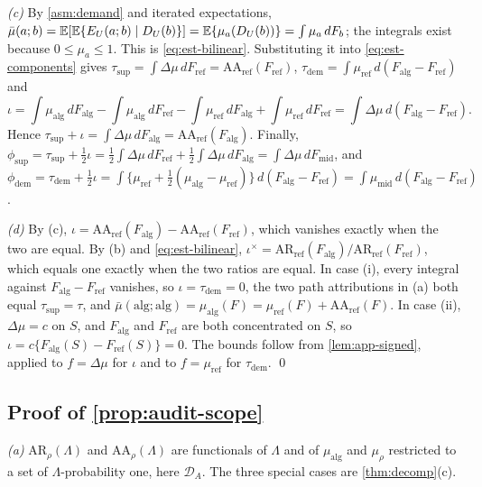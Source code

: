 \emph{(c)} By \cref{asm:demand} and iterated expectations, $\bar\mu(a;b)=\mathbb{E}[\mathbb{E}\{E_U(a;b)\mid D_U(b)\}]=\mathbb{E}\{\mu_a(D_U(b))\}=\int\mu_a\,dF_b$; the integrals exist because $0\le\mu_a\le1$. This is \eqref{eq:est-bilinear}. Substituting it into \eqref{eq:est-components} gives $\tau_{\mathrm{sup}}=\int\Delta\mu\,dF_{\mathrm{ref}}=\mathrm{AA}_{\mathrm{ref}}(F_{\mathrm{ref}})$, $\tau_{\mathrm{dem}}=\int\mu_{\mathrm{ref}}\,d(F_{\mathrm{alg}}-F_{\mathrm{ref}})$ and
\[
  \iota=\int\mu_{\mathrm{alg}}\,dF_{\mathrm{alg}}-\int\mu_{\mathrm{alg}}\,dF_{\mathrm{ref}}-\int\mu_{\mathrm{ref}}\,dF_{\mathrm{alg}}+\int\mu_{\mathrm{ref}}\,dF_{\mathrm{ref}}=\int\Delta\mu\,d(F_{\mathrm{alg}}-F_{\mathrm{ref}}).
\]
Hence $\tau_{\mathrm{sup}}+\iota=\int\Delta\mu\,dF_{\mathrm{alg}}=\mathrm{AA}_{\mathrm{ref}}(F_{\mathrm{alg}})$. Finally, $\phi_{\mathrm{sup}}=\tau_{\mathrm{sup}}+\frac12\iota=\frac12\int\Delta\mu\,dF_{\mathrm{ref}}+\frac12\int\Delta\mu\,dF_{\mathrm{alg}}=\int\Delta\mu\,dF_{\mathrm{mid}}$, and
$\phi_{\mathrm{dem}}=\tau_{\mathrm{dem}}+\frac12\iota=\int\{\mu_{\mathrm{ref}}+\frac12(\mu_{\mathrm{alg}}-\mu_{\mathrm{ref}})\}\,d(F_{\mathrm{alg}}-F_{\mathrm{ref}})=\int\mu_{\mathrm{mid}}\,d(F_{\mathrm{alg}}-F_{\mathrm{ref}})$.

\emph{(d)} By (c), $\iota=\mathrm{AA}_{\mathrm{ref}}(F_{\mathrm{alg}})-\mathrm{AA}_{\mathrm{ref}}(F_{\mathrm{ref}})$, which vanishes exactly when the two are equal. By (b) and \eqref{eq:est-bilinear}, $\iota^{\times}=\mathrm{AR}_{\mathrm{ref}}(F_{\mathrm{alg}})/\mathrm{AR}_{\mathrm{ref}}(F_{\mathrm{ref}})$, which equals one exactly when the two ratios are equal.
In case (i), every integral against $F_{\mathrm{alg}}-F_{\mathrm{ref}}$ vanishes, so $\iota=\tau_{\mathrm{dem}}=0$, the two path attributions in (a) both equal $\tau_{\mathrm{sup}}=\tau$, and $\bar\mu(\mathrm{alg};\mathrm{alg})=\mu_{\mathrm{alg}}(F)=\mu_{\mathrm{ref}}(F)+\mathrm{AA}_{\mathrm{ref}}(F)$.
In case (ii), $\Delta\mu=c$ on $S$, and $F_{\mathrm{alg}}$ and $F_{\mathrm{ref}}$ are both concentrated on $S$, so $\iota=c\{F_{\mathrm{alg}}(S)-F_{\mathrm{ref}}(S)\}=0$.
The bounds follow from \cref{lem:app-signed}, applied to $f=\Delta\mu$ for $\iota$ and to $f=\mu_{\mathrm{ref}}$ for $\tau_{\mathrm{dem}}$. \qed

\subsection{Proof of \texorpdfstring{\cref{prop:audit-scope}}{the audit-scope proposition}}\label{app:pf-audit}

\emph{(a)} $\mathrm{AR}_\rho(\Lambda)$ and $\mathrm{AA}_\rho(\Lambda)$ are functionals of $\Lambda$ and of $\mu_{\mathrm{alg}}$ and $\mu_\rho$ restricted to a set of $\Lambda$-probability one, here $\mathcal D_A$. The three special cases are \cref{thm:decomp}(c).

